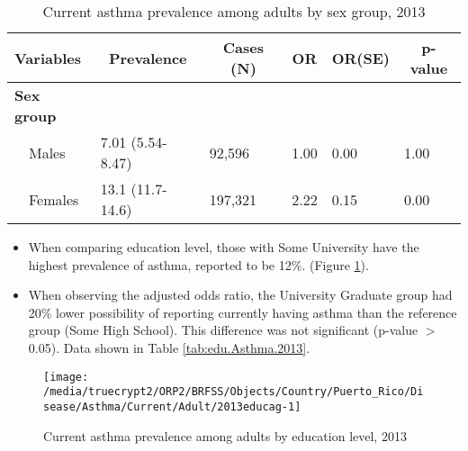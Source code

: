 \begin{table}[H]
\caption{Current asthma prevalence among adults by sex group, 2013\label{tab:sex.Asthma.2013}} 
\begin{center}
\begin{tabular}{llllll}
\hline\hline
\multicolumn{1}{l}{Variables}&\multicolumn{1}{c}{Prevalence}&\multicolumn{1}{c}{Cases (N)}&\multicolumn{1}{c}{OR}&\multicolumn{1}{c}{OR(SE)}&\multicolumn{1}{c}{p-value}\tabularnewline
\hline
{\bfseries Sex group}&&&&&\tabularnewline
~~Males&7.01 (5.54-8.47)& 92,596&1.00&0.00&1.00\tabularnewline
~~Females&13.1 (11.7-14.6)&197,321&2.22&0.15&0.00\tabularnewline
\hline
\end{tabular}\end{center}

\end{table}


\newpage
\begin{itemize}

\item When comparing education level, those with
Some University
have the highest prevalence of asthma, reported to be 12\%.
(Figure \ref{fig:edu.Asthma.2013}).

\item 
When observing the adjusted odds ratio, the University Graduate group had 20\% lower possibility of reporting currently having asthma than the reference group (Some High School).
This difference was not significant (p-value $>$ 0.05).  Data shown in Table \ref{tab:edu.Asthma.2013}.

\end{itemize}

\begin{figure}[H]
\caption{Current asthma prevalence among adults by education level, 
         2013}
\begin{knitrout}
\color{fgcolor}

{\centering \texttt{[image: /media/truecrypt2/ORP2/BRFSS/Objects/Country/Puerto\_Rico/Disease/Asthma/Current/Adult/2013educag-1]} 

}



\end{knitrout}
 \label{fig:edu.Asthma.2013}
\end{figure}

